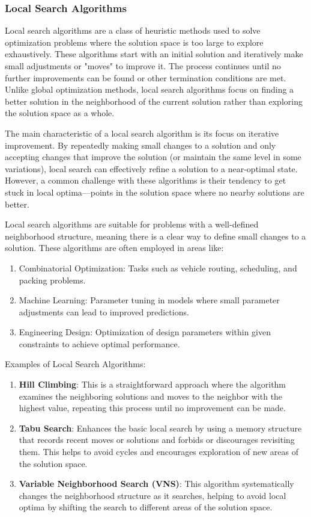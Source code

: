 \documentclass[
]{article}
\begin{document}
\hypertarget{nadpis-uxfarovnux11b-3-2}{%
\subsubsection{Local Search Algorithms}\label{nadpis-uxfarovnux11b-3-2}}

Local search algorithms are a class of heuristic methods used to solve optimization problems where the solution space is too large to explore exhaustively. These algorithms start with an initial solution and iteratively make small adjustments or "moves" to improve it. The process continues until no further improvements can be found or other termination conditions are met. Unlike global optimization methods, local search algorithms focus on finding a better solution in the neighborhood of the current solution rather than exploring the solution space as a whole.

The main characteristic of a local search algorithm is its focus on iterative improvement. By repeatedly making small changes to a solution and only accepting changes that improve the solution (or maintain the same level in some variations), local search can effectively refine a solution to a near-optimal state. However, a common challenge with these algorithms is their tendency to get stuck in local optima—points in the solution space where no nearby solutions are better.

Local search algorithms are suitable for problems with a well-defined neighborhood structure, meaning there is a clear way to define small changes to a solution. These algorithms are often employed in areas like:

\begin{enumerate}
  \item Combinatorial Optimization: Tasks such as vehicle routing, scheduling, and packing problems.
  \item Machine Learning: Parameter tuning in models where small parameter adjustments can lead to improved predictions.
  \item Engineering Design: Optimization of design parameters within given constraints to achieve optimal performance.
\end{enumerate}
  
Examples of Local Search Algorithms:
\begin{enumerate}
  \item \textbf{Hill Climbing}: This is a straightforward approach where the algorithm examines the neighboring solutions and moves to the neighbor with the highest value, repeating this process until no improvement can be made.
  \item \textbf{Tabu Search}: Enhances the basic local search by using a memory structure that records recent moves or solutions and forbids or discourages revisiting them. This helps to avoid cycles and encourages exploration of new areas of the solution space.
  \item \textbf{Variable Neighborhood Search (VNS)}: This algorithm systematically changes the neighborhood structure as it searches, helping to avoid local optima by shifting the search to different areas of the solution space.
\end{enumerate}
\end{document}
